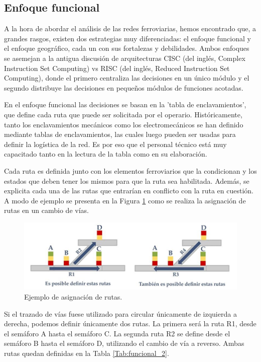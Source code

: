 \subsection{Enfoque funcional}

    A la hora de abordar el análisis de las redes ferroviarias, hemos encontrado que, a grandes rasgos, existen dos estrategias muy diferenciadas: el enfoque funcional y el enfoque geográfico, cada un con sus fortalezas y debilidades. Ambos enfoques se asemejan a la antigua discusión de arquitecturas CISC (del inglés, Complex Instruction Set Computing) vs RISC (del inglés, Reduced Instruction Set Computing), donde el primero centraliza las decisiones en un único módulo y el segundo distribuye las decisiones en pequeños módulos de funciones acotadas.    

    En el enfoque funcional las decisiones se basan en la 'tabla de enclavamientos', que define cada ruta que puede ser solicitada por el operario. Históricamente, tanto los enclavamientos mecánicos como los electromecánicos se han definido mediante tablas de enclavamientos, las cuales luego pueden ser usadas para definir la logística de la red. Es por eso que el personal técnico está muy capacitado tanto en la lectura de la tabla como en su elaboración.
    
    Cada ruta es definida junto con los elementos ferroviarios que la condicionan y los estados que deben tener los mismos para que la ruta sea habilitada. Además, se explicita cada una de las rutas que entrarían en conflicto con la ruta en cuestión. A modo de ejemplo se presenta en la Figura \ref{fig:funcional_1} como se realiza la asignación de rutas en un cambio de vías.

    \begin{figure}[h]
        \centering
        \includegraphics[width=1\textwidth]{Figuras/rutas.PNG}
        \centering\caption{Ejemplo de asignación de rutas.}
        \label{fig:funcional_1}
    \end{figure}

    Si el trazado de vías fuese utilizado para circular únicamente de izquierda a derecha, podemos definir únicamente dos rutas. La primera será la ruta R1, desde el semáforo A hasta el semáforo C. La segunda ruta R2 se define desde el semáforo B hasta el semáforo D, utilizando el cambio de vía a reverso. Ambas rutas quedan definidas en la Tabla \ref{Tab:funcional_2}.

